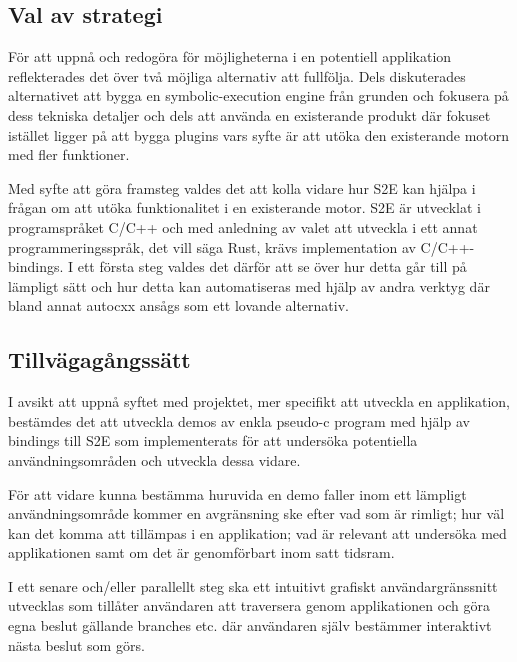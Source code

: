 \subsection{Val av strategi} 
För att uppnå och redogöra för möjligheterna i en
potentiell applikation reflekterades det över två möjliga alternativ att
fullfölja. Dels diskuterades alternativet att bygga en symbolic-execution engine
från grunden och fokusera på dess tekniska detaljer och dels att använda en
existerande produkt där fokuset istället ligger på att bygga plugins vars syfte
är att utöka den existerande motorn med fler funktioner. 

Med syfte att göra framsteg valdes det att kolla vidare hur S2E kan hjälpa i
frågan om att utöka funktionalitet i en existerande motor. S2E är utvecklat
i programspråket C/C++ och med anledning av valet att utveckla i ett
annat programmeringsspråk, det vill säga Rust, krävs implementation av
C/C++-bindings. I ett första steg valdes det därför att se över hur detta går till
på lämpligt sätt och hur detta kan automatiseras med hjälp av andra verktyg
där bland annat autocxx ansågs som ett lovande alternativ. 

\subsection{Tillvägagångssätt} 
I avsikt att uppnå syftet med projektet, mer
specifikt att utveckla en applikation, bestämdes det att utveckla demos av enkla
pseudo-c program med hjälp av bindings till S2E som implementerats för att
undersöka potentiella användningsområden och utveckla dessa vidare. 

För att vidare kunna bestämma huruvida en demo faller inom ett lämpligt
användningsområde kommer en avgränsning ske efter vad som är rimligt; hur väl
kan det komma att tillämpas i en applikation; vad är relevant att undersöka med
applikationen samt om det är genomförbart inom satt tidsram. 

I ett senare och/eller parallellt steg ska ett intuitivt grafiskt användargränssnitt
utvecklas som tillåter användaren att traversera genom applikationen och göra
egna beslut gällande branches etc. där användaren själv bestämmer interaktivt
nästa beslut som görs. 




%  

